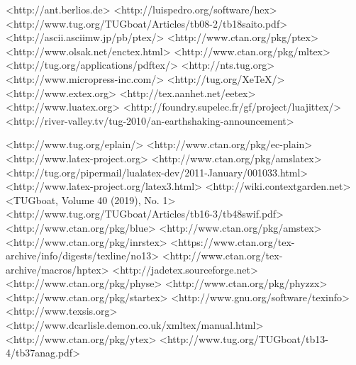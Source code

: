 	<http://ant.berlios.de>
	<http://luispedro.org/software/hex>
		<http://www.tug.org/TUGboat/Articles/tb08-2/tb18saito.pdf>
	<http://ascii.asciimw.jp/pb/ptex/>
	<http://www.ctan.org/pkg/ptex>
	<http://www.olsak.net/enctex.html>
	<http://www.ctan.org/pkg/mltex>
	<http://tug.org/applications/pdftex/>
	<http://nts.tug.org>
	<http://www.micropress-inc.com/>	
	<http://tug.org/XeTeX/>
	<http://www.extex.org>	
	<http://tex.aanhet.net/eetex>	
	<http://www.luatex.org>
	<http://foundry.supelec.fr/gf/project/luajittex/>
	<http://river-valley.tv/tug-2010/an-earthshaking-announcement>
	
	<http://www.tug.org/eplain/>
	<http://www.ctan.org/pkg/ec-plain>
	<http://www.latex-project.org>
	<http://www.ctan.org/pkg/amslatex>
	<http://tug.org/pipermail/lualatex-dev/2011-January/001033.html>
	<http://www.latex-project.org/latex3.html>
	<http://wiki.contextgarden.net>
	<TUGboat, Volume 40 (2019), No. 1>
	<http://www.tug.org/TUGboat/Articles/tb16-3/tb48swif.pdf>
	<http://www.ctan.org/pkg/blue>
	<http://www.ctan.org/pkg/amstex>
	<http://www.ctan.org/pkg/inrstex>
	<https://www.ctan.org/tex-archive/info/digests/texline/no13>
	<http://www.ctan.org/tex-archive/macros/hptex>
	<http://jadetex.sourceforge.net>
	<http://www.ctan.org/pkg/physe>
	<http://www.ctan.org/pkg/phyzzx>
	<http://www.ctan.org/pkg/startex>
	<http://www.gnu.org/software/texinfo>
	<http://www.texsis.org>
	<http://www.dcarlisle.demon.co.uk/xmltex/manual.html>
	<http://www.ctan.org/pkg/ytex>
	<http://www.tug.org/TUGboat/tb13-4/tb37anag.pdf>

